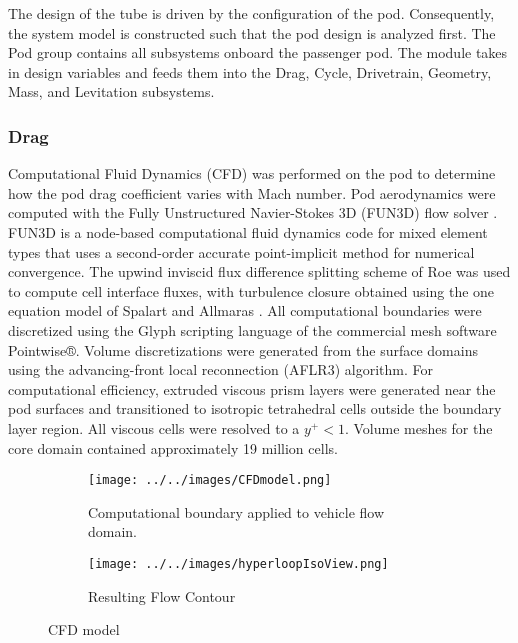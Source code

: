 
     The design of the tube is driven by the configuration of the pod.
     Consequently, the system model is constructed such that the pod design is analyzed first.
     The Pod group contains all subsystems onboard the passenger pod.
     The module takes in design variables and feeds them into the Drag, Cycle,
     Drivetrain, Geometry, Mass, and Levitation subsystems.

  \subsubsection{Drag}
    Computational Fluid Dynamics (CFD) was performed on the pod to determine
    how the pod drag coefficient varies with Mach number.
    Pod aerodynamics were computed with the Fully Unstructured Navier-Stokes 3D
    (FUN3D) flow solver \cite{Biedron}. FUN3D is a node-based computational fluid dynamics
    code for mixed element types that uses a second-order accurate point-implicit
    method for numerical convergence. The upwind inviscid flux difference
    splitting scheme of Roe \cite{Roe} was used to compute cell interface fluxes,
    with turbulence closure obtained using the one equation model of Spalart
    and Allmaras \cite{Spalart}.
    All computational boundaries were discretized using the Glyph scripting
    language of the commercial mesh software Pointwise®. Volume discretizations
    were generated from the surface domains using the advancing-front local
    reconnection (AFLR3)\cite{Marcum} algorithm. For computational efficiency, extruded
    viscous prism layers were generated near the pod surfaces and transitioned
    to isotropic tetrahedral cells outside the boundary layer region.
    All viscous cells were resolved to a $y^{+} < 1$. Volume meshes for the core
    domain contained approximately 19 million cells.

    \begin{figure}[h!]
      \centering
      \begin{subfigure}[t]{.5\textwidth}
        \centering
        \texttt{[image: ../../images/CFDmodel.png]}
        \caption{Computational boundary applied to vehicle flow domain.}
        \label{fig:CFDmodel}
      \end{subfigure}%
      \begin{subfigure}[t]{.5\textwidth}
        \centering
        \texttt{[image: ../../images/hyperloopIsoView.png]}
        \caption{Resulting Flow Contour}
      \label{fig:CFDresults}
      \end{subfigure}
      \caption{CFD model}
      \label{fig:CFD}
    \end{figure}

